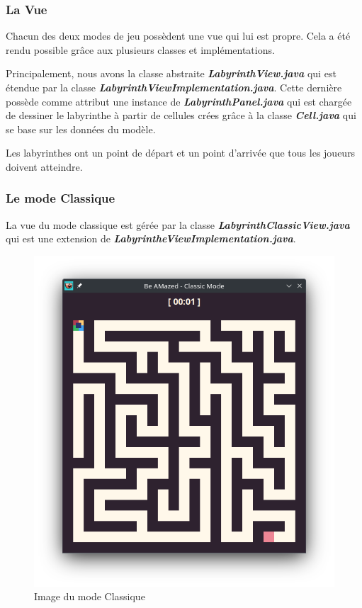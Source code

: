\subsubsection{La Vue}
\label{subsubsec:vue}

Chacun des deux modes de jeu possèdent une vue qui lui est propre.
Cela a été rendu possible grâce aux plusieurs classes et implémentations.

Principalement, nous avons la classe abstraite \textbf{\textit{LabyrinthView.java}} qui est étendue par la classe \textbf{\textit{LabyrinthViewImplementation.java}}.
Cette dernière possède comme attribut une instance de
\textbf{\textit{LabyrinthPanel.java}} qui est chargée de dessiner le labyrinthe à partir de cellules crées grâce à la classe \textbf{\textit{Cell.java}} qui se base sur les données du modèle.

Les labyrinthes ont un point de départ et un point d'arrivée que tous les joueurs doivent atteindre.

\newpage

\subsubsection*{Le mode Classique}

La vue du mode classique est gérée par la classe \textbf{\textit{LabyrinthClassicView.java}} qui est une extension de \textbf{\textit{LabyrintheViewImplementation.java}}.

\begin{figure}[!htb]%
    \centering
    \includegraphics[scale=0.3]{ressources/Implementation/Labyrinthe/Vue/Classic/Classic.png}%
    \caption{Image du mode Classique}%
\end{figure}


